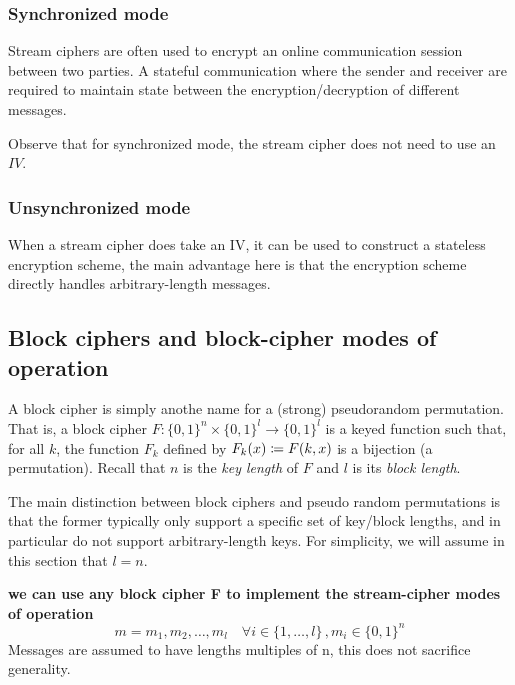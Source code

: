 \documentclass[12pt]{article}
\begin{document}
\subsubsection{Synchronized mode}
Stream ciphers are often used to encrypt an online communication session between two parties. A stateful communication where the sender and receiver are required to maintain state between the encryption/decryption of diﬀerent messages.

Observe that for synchronized mode, the stream cipher does not need to
use an $IV$.
\subsubsection{Unsynchronized mode}
When a stream cipher does take an IV, it can be used to construct a stateless encryption scheme, the main advantage here is that the encryption scheme directly handles arbitrary-length messages.

\subsection{Block ciphers and block-cipher modes of operation}
A block cipher is simply anothe name for a (strong) pseudorandom permutation. That is, a block cipher $F: \{0,1\}^n \times \{0,1\}^l \rightarrow \{0,1\}^l$ is a keyed function such that, for all $k$, the function $F_k$ defined by $F_k(x) \coloneqq F(k,x)$ is a bijection (a permutation). Recall that $n$ is the \emph{key length} of $F$ and $l$ is its \emph{block length}.

The main distinction between block ciphers and pseudo random permutations is that the former typically only support a specific set of key/block lengths, and in particular do not support arbitrary-length keys. For simplicity, we will assume in this section that $l=n$.

\textbf{we can use any block cipher F to implement the stream-cipher modes of operation}
\begin{equation*}
m=m_1,m_2,\dots,m_l \quad \forall i \in \{1,\dots,l\}\,, m_i \in \{0,1\}^n
\end{equation*}
Messages are assumed to have lengths multiples of n, this does not sacrifice generality.
\newpage
\end{document}
